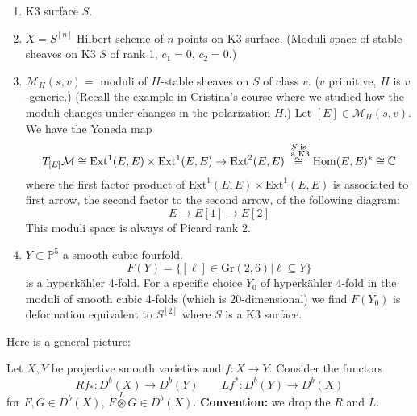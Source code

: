 \begin{example}
\label{example-hyperkahler}
\begin{enumerate}
\item K3 surface $S$.
\item $X=S^{[n]}$ Hilbert scheme of $n$ points on K3 surface. (Moduli space of
stable sheaves on K3 $S$ of rank 1,  $c_1=0$, $c_2=0$.)
\item $\mathcal{M}_H(s,v)=$ moduli of $H$-stable sheaves on $S$ of class $v$.
($v$ primitive, $H$ is $v$-generic.) (Recall the example in Cristina's course
where we studied how the moduli changes under changes in the polarization $H$.)
Let $[E] \in \mathcal{M}_H(s,v)$. We have the Yoneda map
 $$
T_{[E]}\mathcal{M}\cong \text{Ext}^1(E,E)\times \text{Ext}^1(E,E)
\to \text{Ext}^2(E,E)\overset{\substack{S \text{ is}\\\text{ a K3}}}{\cong}\mathop{\mathrm{Hom}}\nolimits(E,E)^*\cong \mathbb{C}
$$
where the first factor product of $\text{Ext}^1(E,E)\times \text{Ext}^1(E,E)$ is
associated to first arrow, the second factor to the second arrow, of the
following diagram:
$$
E \to E[1] \to E[2]
$$
This moduli space is always of Picard rank 2.
\item $Y \subset \mathbb{P}^5$ a smooth cubic fourfold.
$$
F(Y)=\{[\ell] \in \text{Gr}(2,6)|\ell \subseteq Y\}
$$
is a hyperkähler 4-fold. For a specific choice $Y_0$ of hyperkähler 4-fold in
the moduli of smooth cubic 4-folds (which is 20-dimensional) we find $F(Y_0)$ is
deformation equivalent to $S^{[2]}$ where $S$ is a K3 surface.
\end{enumerate}
\end{example}

\medskip\noindent
Here is a general picture:
\iffalse$$
\xymatrix{
\substack{\text{cubic 4-fold $Y$} \\ D^b(Y)}\ar[dr]&  &  
\substack{\text{moduli of} \\ \text{stable objects}\\ \text{in $\text{Ku}_Y$ as}
\\ \text{HK variety}}\\
&\substack{\text{sod K3} \\ \text{cat conditions} \\ \text{Ku}_Y }
\ar[ur]_{\substack{\text{stability} \\ \text{conditions}}}
$$\fi

\medskip\noindent
Let $X,Y$ be projective smooth varieties and $f:X\to Y$. Consider the functors
$$
Rf_*:D^b(X) \to D^b(Y)\qquad Lf^*:D^b(Y) \to D^b(X)
$$
for $F,G \in D^b(X)$, $F\overset{L}{\otimes}G \in D^b(X)$. {\bf Convention:} we
drop the $R$ and $L$.

